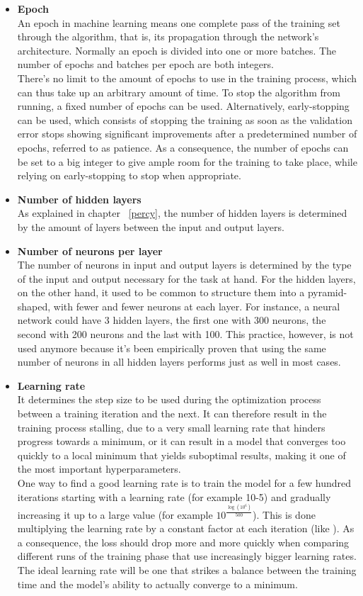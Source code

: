 \begin{itemize}
    \item \textbf{Epoch}
    \\An epoch in machine learning means one complete pass of the training set through the algorithm, that is, its propagation through the network’s architecture. Normally an epoch is divided into one or more batches. The number of epochs and batches per epoch are both integers.
    \\There’s no limit to the amount of epochs to use in the training process, which can thus take up an arbitrary amount of time. To stop the algorithm from running, a fixed number of epochs can be used. Alternatively, early-stopping can be used, which consists of stopping the training as soon as the validation error stops showing significant improvements after a predetermined number of epochs, referred to as patience. As a consequence, the number of epochs can be set to a big integer to give ample room for the training to take place, while relying on early-stopping to stop when appropriate.
    \item \textbf{Number of hidden layers}
    \\As explained in chapter ~\ref{percy}, the number of hidden layers is determined by the amount of layers between the input and output layers.
    \item \textbf{Number of neurons per layer}
    \\The number of neurons in input and output layers is determined by the type of the input and output necessary for the task at hand. For the hidden layers, on the other hand, it used to be common to structure them into a pyramid-shaped, with fewer and fewer neurons at each layer. For instance, a neural network could have 3 hidden layers, the first one with 300 neurons, the second with 200 neurons and the last with 100. 
    This practice, however, is not used anymore because it’s been empirically proven that using the same number of neurons in all hidden layers performs just as well in most cases.
    \item \textbf{Learning rate}
    \\It determines the step size to be used during the optimization process between a training iteration and the next. It can therefore result in the training process stalling, due to a very small learning rate that hinders progress towards a minimum, or it can result in a model that converges too quickly to a local minimum that yields suboptimal results, making it one of the most important hyperparameters.
    \\One way to find a good learning rate is to train the model for a few hundred iterations starting with a learning rate (for example 10-5) and gradually increasing it up to a large value (for example $10^{\frac{\log \left( 10^{6}\right)  }{500} }$). This is done multiplying the learning rate by a constant factor at each iteration (like ). As a  consequence, the loss should drop more and more quickly when comparing different runs of the training phase that use increasingly bigger learning rates. The ideal learning rate will be one that strikes a balance between the training time and the model’s ability to actually converge to a minimum.
    
\end{itemize}

